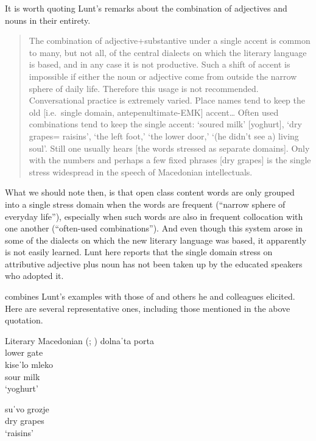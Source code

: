 \documentclass[output=paper,
modfonts
]{LSP/langsci}
\begin{document}
It is worth quoting Lunt’s remarks about the combination of adjectives and nouns in their entirety. 

\begin{quote}
The combination of adjective+substantive under a single accent is common to many, but not all, of the central dialects on which the literary language is based, and in any case it is not productive. Such a shift of accent is impossible if either the noun or adjective come from outside the narrow sphere of daily life. Therefore this usage is not recommended. Conversational practice is extremely varied. Place names tend to keep the old [i.e.\ single domain, antepenultimate-EMK] accent… Often used combinations tend to keep the single accent: ‘soured milk’ [yoghurt], ‘dry grapes= raisins’, ‘the left foot,' ‘the lower door,' ‘(he didn’t see a) living soul’. Still one usually hears [the words stressed as separate domains]. Only with the numbers and perhaps a few fixed phrases [dry grapes] is the single stress widespread in the speech of Macedonian intellectuals. \citep[24--25]{lunt1952}
\end{quote}
What we should note then, is that open class content words are only grouped into a single stress domain when the words are frequent (“narrow sphere of everyday life”), especially when such words are also in frequent collocation with one another (“often-used combinations”). And even though this system arose in some of the dialects on which the new literary language was based, it apparently is not easily learned. Lunt here reports that the single domain stress on attributive adjective plus noun has not been taken up by the educated speakers who adopted it. 

\citet{franks1987,franks1989} combines Lunt’s examples with those of \citet{koneski1976} and others he and colleagues elicited. Here are several representative ones, including those mentioned in the above quotation.

\ea Literary Macedonian (\citealt{lunt1952}; \citealt[989]{franks1987})
	\ea \gll dolnaˈta porta\\
	lower gate\\
	
	\ex \gll kiseˈlo mleko\\
	sour milk\\
	
	\glt ‘yoghurt’
	
	\ex suˈvo grozje\\
	dry grapes\\
	\glt ‘raisins’
\end{document}
